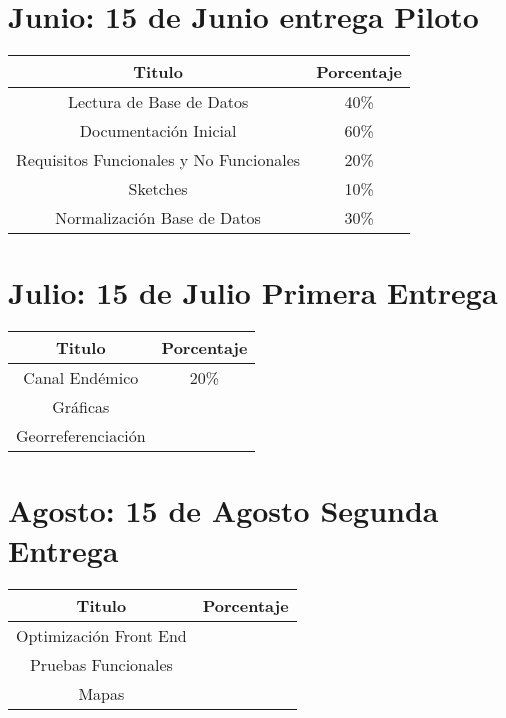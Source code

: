 \section{Junio: 15 de Junio entrega Piloto}

\begin{center}
\begin{tabular}{|c|c|}
\hline 
Titulo & Porcentaje \\ \hline
\hline
Lectura de Base de Datos & 40\% \\ \hline
Documentación Inicial & 60\% \\ \hline
Requisitos Funcionales y No Funcionales & 20\%\\ \hline
Sketches & 10\%\\ \hline
Normalización Base de Datos & 30\%\\ \hline

\end{tabular}
\end{center}

\section{Julio: 15 de Julio Primera Entrega}

\begin{center}
\begin{tabular}{|c|c|}
\hline 
Titulo & Porcentaje \\ \hline
\hline
Canal Endémico & 20\% \\ \hline
Gráficas & \\ \hline
Georreferenciación & \\ \hline
\end{tabular}
\end{center}


\section{Agosto: 15 de Agosto Segunda Entrega }


\begin{center}
\begin{tabular}{|c|c|}
\hline 
Titulo & Porcentaje \\ \hline
\hline
Optimización Front End & \\ \hline
Pruebas Funcionales & \\ \hline
Mapas & \\ \hline
\end{tabular}
\end{center}

